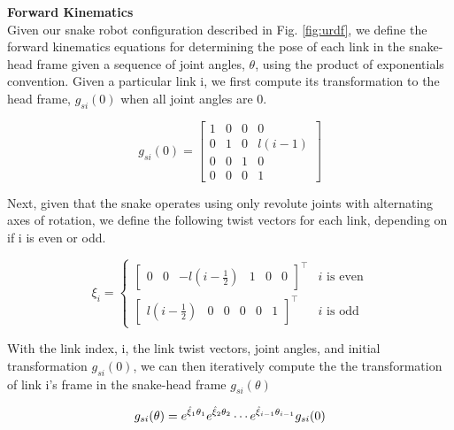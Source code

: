 \documentclass[letterpaper, 10 pt, conference]{ieeeconf}  %
\begin{document}
\noindent \textbf{Forward Kinematics} \\
Given our snake robot configuration described in Fig. \ref{fig:urdf}, we define the forward kinematics equations for determining the pose of each link in the snake-head frame given a sequence of joint angles, $\theta$,  using the product of exponentials convention. Given a particular link i, we first compute its transformation to the head frame, $g_{si}(0)$ when all joint angles are 0. 

\begin{equation}
    g_{si}(0) = \begin{bmatrix}
        1 & 0 & 0 & 0 \\
        0 & 1 & 0 & l(i-1) \\
        0 & 0 & 1 & 0 \\
        0 & 0 & 0 & 1
    \end{bmatrix}
\end{equation}

Next, given that the snake operates using only revolute joints with alternating axes of rotation, we define the following twist vectors for each link, depending on if i is even or odd.  

\begin{equation}
    \xi_i = \begin{cases}
        \begin{bmatrix}
            0 & 0 & -l(i-\frac{1}{2}) & 1 & 0 & 0
        \end{bmatrix}^\top & i \text{ is even} \\
        \begin{bmatrix}
            l(i-\frac{1}{2}) & 0 & 0 & 0 & 0 & 1
        \end{bmatrix}^\top & i \text{ is odd}
    \end{cases} 
\end{equation}

With the link index, i, the link twist vectors, joint angles, and initial transformation $g_{si}(0)$, we can then iteratively compute the the transformation of link i's frame in the snake-head frame $g_{si}(\theta)$

\begin{equation}
     g_{si}(\theta) = e^{\hat{\xi}_1 \theta_1} e^{\hat{\xi}_2 \theta_2} \cdots e^{\hat{\xi}_{i-1} \theta_{i-1}} g_{si}(0) \\
\end{equation} \\
\end{document}

